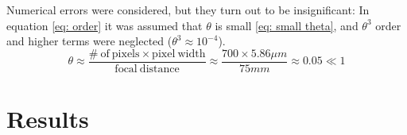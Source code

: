 \documentclass[11pt]{article}
\begin{document}
Numerical errors were considered, but they turn out to be insignificant: In equation \eqref{eq: order} it was assumed that $\theta$ is small \eqref{eq: small theta}, and $\theta^3$ order and higher terms were neglected ($\theta^3 \approx 10^{-4}$). 
\begin{equation}
    \theta \approx \frac{\mathrm{\#\ of\ pixels} \times \mathrm{pixel\ width}}{\mathrm{focal\ distance}} \approx \frac{700 \times 5.86 \si{\mu m}}{75 \si{mm}}
    \approx 0.05 \ll 1
    \label{eq: small theta}
\end{equation}


\section{Results} \label{sec: results}
\end{document}
